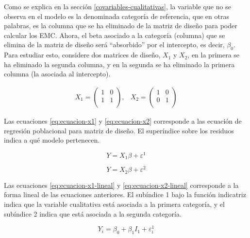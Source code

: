 \documentclass[
  11pt,
]{book}
\theoremstyle{definition}
\theoremstyle{definition}
\theoremstyle{definition}
\theoremstyle{definition}
\theoremstyle{remark}
\begin{document}
Como se explica en la sección \ref{covariables-cualitativas}, la variable que no se observa en el modelo es la denominada categoría de referencia, que en otras palabras, es la columna que se ha eliminado de la matriz de diseño para poder calcular los EMC. Ahora, el beta asociado a la categoría (columna) que se elimina de la matriz de diseño será ``absorbido'' por el intercepto, es decir, \(\beta_0\). Para estudiar esto, considere dos matrices de diseño, \(X_1\) y \(X_2\), en la primera se ha eliminado la segunda columna, y en la segunda se ha eliminado la primera columna (la asociada al intercepto).

\begin{equation}
\begin{matrix}
X_1 = \begin{pmatrix}
1 & 0 \\
1 & 1 \\
\end{pmatrix},
&
X_2 = \begin{pmatrix}
1 & 0 \\
0 & 1 \\
\end{pmatrix}
\end{matrix}
\label{eq:matriz-corregidas}
\end{equation}

Las ecuaciones \eqref{eq:ecuacion-x1} y \eqref{eq:ecuacion-x2} corresponde a las ecuación de regresión poblacional para matriz de diseño. El superíndice sobre los residuos indica a qué modelo pertenecen.

\begin{equation}
Y = X_1\beta + \varepsilon^1
\label{eq:ecuacion-x1}
\end{equation}

\begin{equation}
Y = X_2\beta + \varepsilon^2 
\label{eq:ecuacion-x2}
\end{equation}

Las ecuaciones \eqref{eq:ecuacion-x1-lineal} y \eqref{eq:ecuacion-x2-lineal} corresponde a la forma lineal de las ecuaciones anteriores. El subíndice 1 bajo la función indicatriz indica que la variable cualitativa está asociada a la primera categoría, y el subíndice 2 indica que está asociada a la segunda categoría.

\begin{equation}
Y_i = \beta_0 + \beta_1I_1 + \varepsilon_i^1
\label{eq:ecuacion-x1-lineal}
\end{equation}
\end{document}

